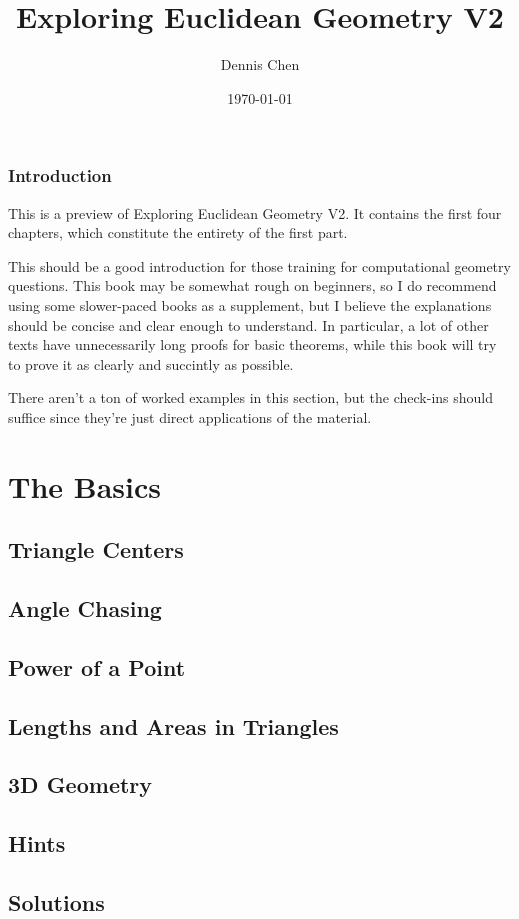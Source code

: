 \documentclass[oneside]{book}
\title{Exploring Euclidean Geometry V2}
\author{Dennis Chen}
\date{\today}
\begin{document}


\maketitle

\section*{Introduction}
This is a preview of Exploring Euclidean Geometry V2. It contains the first four chapters, which constitute the entirety of the first part.

This should be a good introduction for those training for computational geometry questions. This book may be somewhat rough on beginners, so I do recommend using some slower-paced books as a supplement, but I believe the explanations should be concise and clear enough to understand. In particular, a lot of other texts have unnecessarily long proofs for basic theorems, while this book will try to prove it as clearly and succintly as possible.

There aren't a ton of worked examples in this section, but the check-ins should suffice since they're just direct applications of the material.

\pagebreak

\toc

\part{The Basics}

\chapter{Triangle Centers}



\chapter{Angle Chasing}



\chapter{Power of a Point}



\chapter{Lengths and Areas in Triangles}



\chapter{3D Geometry}



\chapter{Hints}



\chapter{Solutions}


\end{document}
